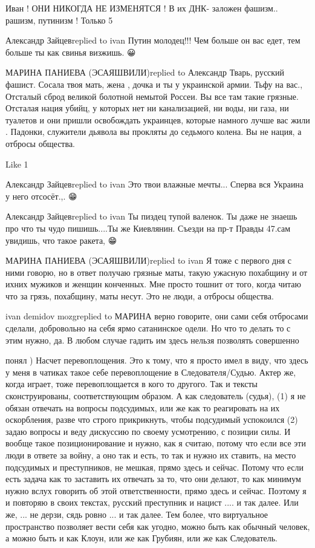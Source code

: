 Иван ! ОНИ НИКОГДА НЕ ИЗМЕНЯТСЯ ! В их ДНК- заложен фашизм.. рашизм, путинизм !
Только 5 %

Александр Зайцевreplied to ivan
Путин молодец!!! Чем больше он вас едет, тем больше ты как свинья визжишь. 😀

МАРИНА ПАНИЕВА (ЭСАЯШВИЛИ)replied to Александр
Тварь, русский фашист. Сосала твоя мать, жена , дочка и ты у украинской армии. Тьфу на вас., Отсталый сброд великой болотной немытой Россеи. Вы все там такие грязные. Отсталая нация убийц, у которых нет ни канализацией, ни воды, ни газа, ни туалетов и они пришли освобождать украинцев, которые намного лучше вас жили . Падонки, служители дьявола вы прокляты до седьмого колена. Вы не нация, а отбросы общества.

    Like 1

Александр Зайцевreplied to ivan
Это твои влажные мечты... Сперва вся Украина у него отсосёт.,. 😁

Александр Зайцевreplied to ivan
Ты пиздец тупой валенок. Ты даже не знаешь про что ты чудо пишишь....Ты же Киевлянин. Съезди на пр-т Правды 47.сам увидишь, что такое ракета, 😁

МАРИНА ПАНИЕВА (ЭСАЯШВИЛИ)replied to ivan
Я тоже с первого дня с ними говорю, но в ответ получаю грязные маты, такую ужасную похабщину и от ихних мужиков и женщин конченных. Мне просто тошнит от того, когда читаю что за грязь, похабщину, маты несут. Это не люди, а отбросы общества.

ivan demidov mozgreplied to МАРИНА
верно говорите, они сами себя отбросами сделали, добровольно на себя ярмо сатанинское одели. Но что то делать то с этим нужно, да. В любом случае гадить им здесь нельзя позволять совершенно

понял ) Насчет перевоплощения. Это к тому, что я просто имел в виду, что здесь
у меня в чатиках такое себе перевоплощение в Следователя/Судью. Актер же, когда
играет, тоже перевоплощается в кого то другого. Так и тексты сконструированы,
соответствующим образом. А как следователь (судья), (1) я не обязан  отвечать
на вопросы подсудимых, или же как то реагировать на их оскорбления, разве что
строго прикрикнуть, чтобы подсудимый успокоился (2) задаю вопросы и веду
дискуссию по своему усмотрению, с позиции силы. И вообще такое позиционирование
и нужно, как я считаю, потому что если все эти люди в ответе за войну, а оно
так и есть, то так и нужно их ставить, на место подсудимых и преступников, не
мешкая, прямо здесь и сейчас. Потому что если есть задача как то заставить их
отвечать за то, что они делают, то как минимум нужно вслух говорить об этой
ответственности, прямо здесь и сейчас. Поэтому я и повторяю в своих текстах,
русский преступник и нацист .... и так далее. Или же, ... не дерзи, сядь ровно
... и так далее. Тем более, что виртуальное пространство позволяет вести себя
как угодно, можно быть как обычный человек, а можно быть и как Клоун, или же
как Грубиян, или же как Следователь.

